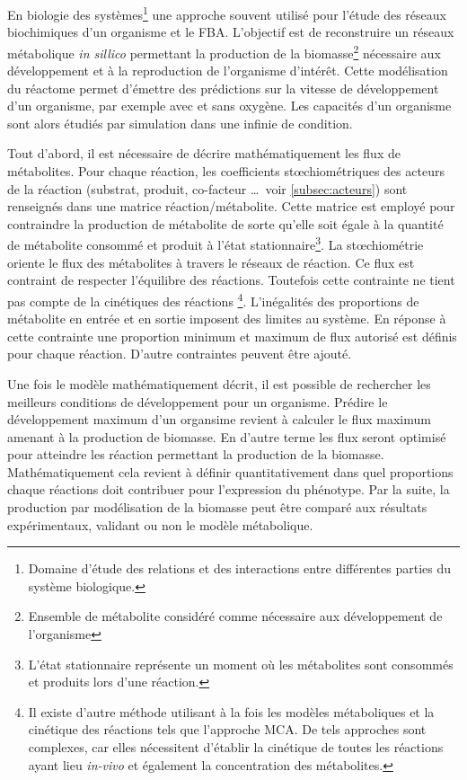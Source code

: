 \begin{refsegment}
    En biologie des systèmes\footnote{Domaine d'étude des relations et des interactions entre différentes parties du système biologique.} une approche souvent utilisé pour l'étude des réseaux biochimiques d'un organisme et le \gls{FBA}\cite{orth2010flux}. L'objectif est de reconstruire un réseaux métabolique \textit{in sillico} permettant la production de la biomasse\footnote{Ensemble de métabolite considéré comme nécessaire aux développement de l'organisme} nécessaire aux développement et à la reproduction de l'organisme d'intérêt. Cette modélisation du réactome permet d'émettre des prédictions sur la vitesse de développement d'un organisme, par exemple avec et sans oxygène. Les capacités d'un organisme sont alors étudiés par simulation dans une infinie de condition.
    
    Tout d'abord, il est nécessaire de décrire mathématiquement les flux de métabolites. Pour chaque réaction, les coefficients stœchiométriques des acteurs de la réaction (substrat, produit, co-facteur \ldots~voir \cref{subsec:acteurs}) sont renseignés dans une matrice réaction/métabolite. Cette matrice est employé pour contraindre la production de métabolite de sorte qu'elle soit égale à la quantité de métabolite consommé et produit à l'état stationnaire\footnote{L'état stationnaire représente un moment où les métabolites sont consommés et produits lors d'une réaction.}.  La stœchiométrie oriente le flux des métabolites à travers le réseaux de réaction. Ce flux est contraint de respecter l'équilibre des réactions. Toutefois cette contrainte ne tient pas compte de la cinétiques des réactions \cite{covert2001metabolic,edwards2002metabolic}\footnote{Il existe d'autre méthode utilisant à la fois les modèles métaboliques et la cinétique des réactions tels que l'approche \gls{MCA}. De tels approches sont complexes, car elles nécessitent d'établir la cinétique de toutes les réactions ayant lieu \textit{in-vivo} et également la concentration des métabolites.}. L'inégalités des proportions de métabolite en entrée et en sortie imposent des limites au système. En réponse à cette contrainte une proportion minimum et maximum de flux autorisé est définis pour chaque réaction. D'autre contraintes peuvent être ajouté.
    
    Une fois le modèle mathématiquement décrit, il est possible de rechercher les meilleurs conditions de développement pour un organisme. Prédire le développement maximum d'un organsime revient à calculer le flux maximum amenant à la production de biomasse. En d'autre terme les flux seront optimisé pour atteindre les réaction permettant la production de la biomasse. Mathématiquement cela revient à définir quantitativement dans quel proportions chaque réactions doit contribuer pour l'expression du phénotype.  Par la suite, la production par modélisation de la biomasse peut être comparé aux résultats expérimentaux, validant ou non le modèle métabolique.
    

\end{refsegment}
